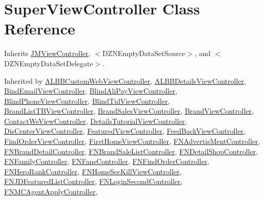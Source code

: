 \hypertarget{interface_super_view_controller}{}\section{Super\+View\+Controller Class Reference}
\label{interface_super_view_controller}


Inherits \mbox{\hyperlink{interface_j_m_view_controller}{J\+M\+View\+Controller}}, $<$\+D\+Z\+N\+Empty\+Data\+Set\+Source$>$, and $<$\+D\+Z\+N\+Empty\+Data\+Set\+Delegate$>$.



Inherited by \mbox{\hyperlink{interface_a_l_b_b_custom_web_view_controller}{A\+L\+B\+B\+Custom\+Web\+View\+Controller}}, \mbox{\hyperlink{interface_a_l_b_b_details_view_controller}{A\+L\+B\+B\+Details\+View\+Controller}}, \mbox{\hyperlink{interface_bind_email_view_controller}{Bind\+Email\+View\+Controller}}, \mbox{\hyperlink{interface_blind_ali_pay_view_controller}{Blind\+Ali\+Pay\+View\+Controller}}, \mbox{\hyperlink{interface_blind_phone_view_controller}{Blind\+Phone\+View\+Controller}}, \mbox{\hyperlink{interface_blind_tid_view_controller}{Blind\+Tid\+View\+Controller}}, \mbox{\hyperlink{interface_brand_list_t_b_view_controller}{Brand\+List\+T\+B\+View\+Controller}}, \mbox{\hyperlink{interface_brand_sales_view_controller}{Brand\+Sales\+View\+Controller}}, \mbox{\hyperlink{interface_brand_view_controller}{Brand\+View\+Controller}}, \mbox{\hyperlink{interface_contact_we_view_controller}{Contact\+We\+View\+Controller}}, \mbox{\hyperlink{interface_details_tutorial_view_controller}{Details\+Tutorial\+View\+Controller}}, \mbox{\hyperlink{interface_dis_center_view_controller}{Dis\+Center\+View\+Controller}}, \mbox{\hyperlink{interface_featured_view_controller}{Featured\+View\+Controller}}, \mbox{\hyperlink{interface_feed_back_view_controller}{Feed\+Back\+View\+Controller}}, \mbox{\hyperlink{interface_find_order_view_controller}{Find\+Order\+View\+Controller}}, \mbox{\hyperlink{interface_first_home_view_controller}{First\+Home\+View\+Controller}}, \mbox{\hyperlink{interface_f_n_advertis_ment_controller}{F\+N\+Advertis\+Ment\+Controller}}, \mbox{\hyperlink{interface_f_n_brand_detail_controller}{F\+N\+Brand\+Detail\+Controller}}, \mbox{\hyperlink{interface_f_n_brand_sale_list_controller}{F\+N\+Brand\+Sale\+List\+Controller}}, \mbox{\hyperlink{interface_f_n_detail_shop_controller}{F\+N\+Detail\+Shop\+Controller}}, \mbox{\hyperlink{interface_f_n_family_controller}{F\+N\+Family\+Controller}}, \mbox{\hyperlink{interface_f_n_fans_controller}{F\+N\+Fans\+Controller}}, \mbox{\hyperlink{interface_f_n_find_order_controller}{F\+N\+Find\+Order\+Controller}}, \mbox{\hyperlink{interface_f_n_hero_rank_controller}{F\+N\+Hero\+Rank\+Controller}}, \mbox{\hyperlink{interface_f_n_home_sec_kill_view_controller}{F\+N\+Home\+Sec\+Kill\+View\+Controller}}, \mbox{\hyperlink{interface_f_n_j_d_featured_list_controller}{F\+N\+J\+D\+Featured\+List\+Controller}}, \mbox{\hyperlink{interface_f_n_login_second_controller}{F\+N\+Login\+Second\+Controller}}, \mbox{\hyperlink{interface_f_n_m_c_agent_apply_controller}{F\+N\+M\+C\+Agent\+Apply\+Controller}}, 